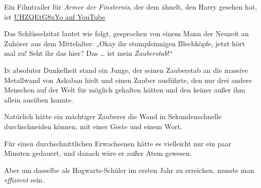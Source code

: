 
\begin{chapterOpeningAuthorNote}
Ein Filmtrailer für \emph{Armee der Finsternis}, der dem ähnelt, den Harry gesehen hat, ist \href{https://www.youtube.com/watch?v=UHZQEtG8xYo}{UHZQEtG8xYo auf YouTube}

Das Schlüsselzitat lautet wie folgt, gesprochen von einem Mann der Neuzeit an Zuhörer aus dem Mittelalter:
„Okay ihr stumpfsinnigen Blechköpfe, jetzt hört mal zu! Seht ihr das hier? Das … ist mein \emph{Zauberstab}!“%
\end{chapterOpeningAuthorNote}

\lettrine{I}{n} absoluter Dunkelheit stand ein Junge, der seinen Zauberstab an die massive Metallwand von Askaban hielt und einen Zauber ausführte, den nur drei andere Menschen auf der Welt für möglich gehalten hätten und den keiner außer ihm allein ausüben konnte.

Natürlich hätte ein mächtiger Zauberer die Wand in Sekundenschnelle durchschneiden können, mit einer Geste und einem Wort.

Für einen durchschnittlichen Erwachsenen hätte es vielleicht nur ein paar Minuten gedauert, und danach wäre er außer Atem gewesen.

Aber um dasselbe als Hogwarts-Schüler im ersten Jahr zu erreichen, musste man \emph{effizient} sein.

